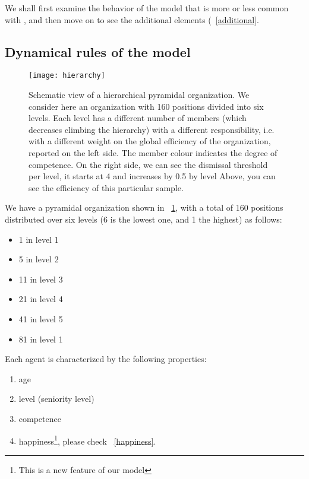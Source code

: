 \documentclass[11pt]{article}
\begin{document}
We shall first examine the behavior of the model that is more or less common with \cite{petercomp}, and then move on to see the additional elements (~\ref{additional}.

\subsection{Dynamical rules of the model}
\begin{figure}
\begin{center}
\texttt{[image: hierarchy]}
\caption{Schematic view of a hierarchical pyramidal organization. We consider here an organization with 160 positions divided into six levels. Each level has a different number of members (which decreases climbing the hierarchy) with a different responsibility, i.e. with a different weight on the global efficiency of the organization, reported on the left side. The member colour indicates the degree of competence. On the right side, we can see the dismissal threshold per level, it starts at 4 and increases by 0.5 by level Above, you can see the efficiency of this particular sample.}
\label{fig:organization}
\end{center}
\end{figure}


We have a pyramidal organization shown in ~\ref{fig:organization}, with a total of 160 positions distributed over six levels (6 is the lowest one, and 1 the highest) as follows:

\begin{itemize}
\item 1 in level 1
\item 5 in level 2
\item 11 in level 3
\item 21 in level 4
\item 41 in level 5
\item 81 in level 1
\end{itemize}

Each agent is characterized by the following properties:

\begin{enumerate}
\item age
\item level (seniority level)
\item competence
\item happiness\footnote{This is a new feature of our model}, please check ~\ref{happiness}.
\end{enumerate}
\end{document}
